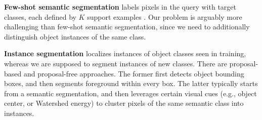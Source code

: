 \documentclass[final]{cvpr}
\begin{document}

\textbf{Few-shot semantic segmentation} labels pixels in the query with  target classes, each defined by $K$ support examples  \cite{shaban2017one,rakelly2018conditional,rakelly2018fewshot,dong2018few,zhang2018sgone,simonyan2014deep, shelhamer2016fully,hu2019attention,siam2019adaptive,zhang2019canet,zhang2019pyramid,yang2020new,nguyen2019feature,wang2019panet}. %
Our problem is arguably more challenging than few-shot semantic segmentation, since we need to additionally distinguish object instances of the same class.



\textbf{Instance segmentation} localizes  instances of object classes seen in training, whereas we are supposed to segment instances of new classes. There are proposal-based and proposal-free approaches. The former  \cite{he2017mask,li2017fully,chen2018masklab,liu2018path,bolya2019yolact} first detects object bounding boxes, and then segments foreground within every box.  The latter  \cite{kirillov2017instancecut,kong2018recurrent,chandra2017dense,fathi2017semantic} typically starts from a semantic segmentation, and then leverages certain visual cues (e.g., object center, or Watershed energy) to cluster pixels of the same semantic class into instances. %
\end{document}

